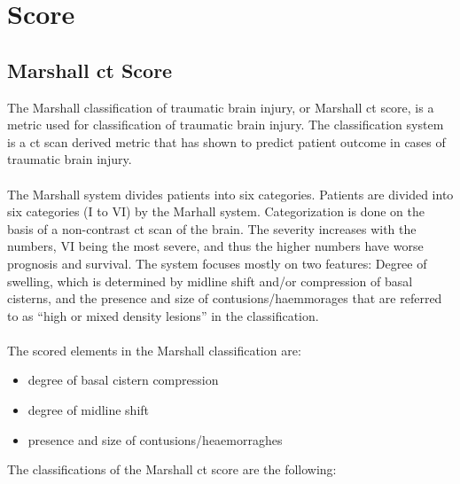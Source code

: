 \documentclass[11pt]{article}
\begin{document}
\section{Score}

\subsection{Marshall \gls{ct} Score}
The Marshall classification of traumatic brain injury, or Marshall \gls{ct} score, is a metric used for classification of traumatic brain injury. The classification system is a \gls{ct} scan derived metric that has shown to predict patient outcome in cases of traumatic brain injury.\cite{gaillardMarshallClassificationTraumatic}\\
\\
The Marshall system divides patients into six categories.
Patients are divided into six categories (I to VI) by the Marhall system. Categorization is done on the basis of a non-contrast \gls{ct} scan of the brain. The severity increases with the numbers, VI being the most severe, and thus the higher numbers have worse prognosis and survival. The system focuses mostly on two features: Degree of swelling, which is determined by midline shift and/or compression of basal cisterns, and the presence and size of contusions/haemmorages that are referred to as ``high or mixed density lesions'' in the classification.\cite{gaillardMarshallClassificationTraumatic}\\
\\
The scored elements in the Marshall classification are:

\begin{itemize}
\item{degree of basal cistern compression}
\item{degree of midline shift}
\item{presence and size of contusions/heaemorraghes}
\end{itemize}

The classifications of the Marshall \gls{ct} score are the following:
\end{document}
